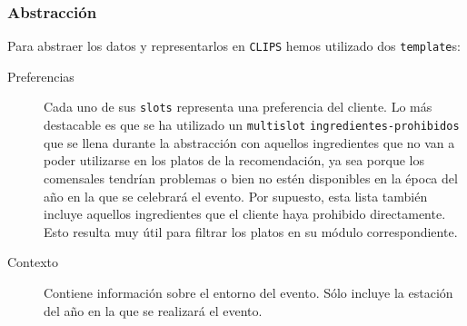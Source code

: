 \subsubsection{Abstracción}
Para abstraer los datos y representarlos en \texttt{CLIPS} hemos utilizado dos \texttt{template}s:

\begin{description}
\item[Preferencias] Cada uno de sus \texttt{slots} representa una preferencia del cliente. Lo más destacable es que se ha utilizado un
 \texttt{multislot} \texttt{ingredientes-prohibidos} que se llena durante la abstracción con aquellos ingredientes que no van a
poder utilizarse en los platos de la recomendación, ya sea porque los comensales tendrían problemas o bien no estén disponibles en la
época del año en la que se celebrará el evento. Por supuesto, esta lista también incluye aquellos ingredientes que el cliente haya
prohibido directamente. Esto resulta muy útil para filtrar los platos en su módulo correspondiente.
\item[Contexto] Contiene información sobre el entorno del evento. Sólo incluye la estación del año en la que se realizará el evento.
\end{description}
